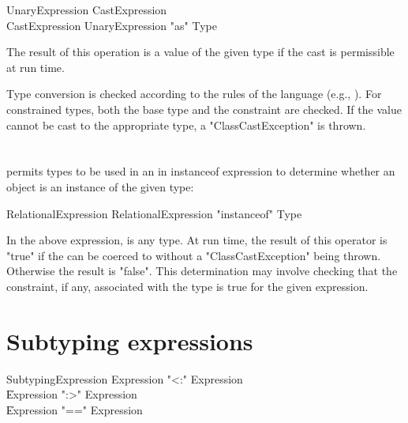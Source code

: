 \begin{grammar}
UnaryExpression \: CastExpression \\
CastExpression \: UnaryExpression \xcd"as" Type \\
\end{grammar}

The result of this operation is a value of the given type if the cast
is permissible at run time.

Type conversion is checked according to the
rules of the \java{} language (e.g., \cite[\S 5.5]{jls2}).
For constrained types, both the base
type and the constraint are checked.
If the
value cannot be cast to the appropriate type, a
\xcd"ClassCastException"
is thrown. 


\section{}
\label{instanceOf}

\Xten{} permits types to be used in an in instanceof expression
to determine whether an object is an instance of the given type:

\begin{grammar}
RelationalExpression \: RelationalExpression \xcd"instanceof" Type
\end{grammar}

In the above expression,  is any type.
At run time, the result of this operator is
\xcd"true" if the  can be
coerced
to  without a \xcd"ClassCastException" being
thrown.  Otherwise the result is \xcd"false".
This determination may involve checking
that the
constraint, if any, associated with the type is true for the
given expression.

\section{Subtyping expressions}

\begin{grammar}
SubtypingExpression \: Expression \xcd"<:" Expression \\
                    \| Expression \xcd":>" Expression \\
                    \| Expression \xcd"==" Expression \\
\end{grammar}

